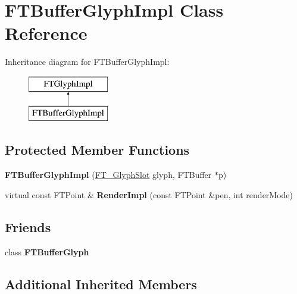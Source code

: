 \hypertarget{class_f_t_buffer_glyph_impl}{}\section{F\+T\+Buffer\+Glyph\+Impl Class Reference}
\label{class_f_t_buffer_glyph_impl}
Inheritance diagram for F\+T\+Buffer\+Glyph\+Impl\+:\begin{figure}[H]
\begin{center}
\leavevmode
\includegraphics[height=2.000000cm]{class_f_t_buffer_glyph_impl}
\end{center}
\end{figure}
\subsection*{Protected Member Functions}
\begin{DoxyCompactItemize}
\item 
{\bfseries F\+T\+Buffer\+Glyph\+Impl} (\hyperlink{struct_f_t___glyph_slot_rec__}{F\+T\+\_\+\+Glyph\+Slot} glyph, F\+T\+Buffer $\ast$p)\hypertarget{class_f_t_buffer_glyph_impl_a02a187494995d95792ef66767f04c56d}{}\label{class_f_t_buffer_glyph_impl_a02a187494995d95792ef66767f04c56d}

\item 
virtual const F\+T\+Point \& {\bfseries Render\+Impl} (const F\+T\+Point \&pen, int render\+Mode)\hypertarget{class_f_t_buffer_glyph_impl_a4f7f56caf34309cf7e1408a631b419de}{}\label{class_f_t_buffer_glyph_impl_a4f7f56caf34309cf7e1408a631b419de}

\end{DoxyCompactItemize}
\subsection*{Friends}
\begin{DoxyCompactItemize}
\item 
class {\bfseries F\+T\+Buffer\+Glyph}\hypertarget{class_f_t_buffer_glyph_impl_a385e2288042fd77f037a715e7801b451}{}\label{class_f_t_buffer_glyph_impl_a385e2288042fd77f037a715e7801b451}

\end{DoxyCompactItemize}
\subsection*{Additional Inherited Members}


